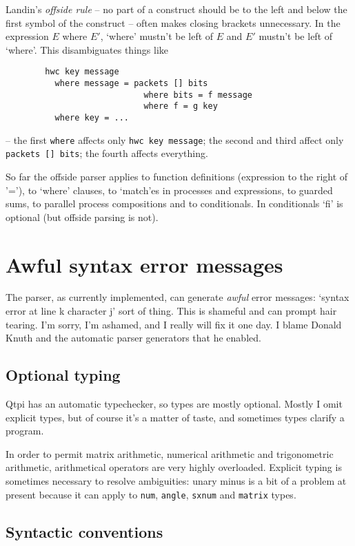 \documentclass[11pt,a4paper]{article}
\newcommand{\verbtt}[1]{\texttt{\small{}#1}}
\begin{document}
Landin's \emph{offside rule} -- no part of a construct should be to the left and below the first symbol of the construct -- often makes closing brackets unnecessary. In the expression $E$ where $E'$, `where' mustn't be left of $E$ and $E'$ mustn't be left of `where'. This disambiguates things like 

\begin{verbatim}
		hwc key message
		  where message = packets [] bits
		                    where bits = f message
		                    where f = g key
		  where key = ...
\end{verbatim}
	
-- the first \verbtt{where} affects only \verbtt{hwc key message}; the second and third affect only \verbtt{packets [] bits}; the fourth affects everything.

So far the offside parser applies to function definitions (expression to the right of '='), to `where' clauses, to `match'es in processes and expressions, to guarded sums, to parallel process compositions and to conditionals. In conditionals `fi' is optional (but offside parsing is not).

\section{Awful syntax error messages}

The parser, as currently implemented, can generate \emph{awful} error messages: `syntax error at line k character j' sort of thing. This is shameful and can prompt hair tearing. I'm sorry, I'm ashamed, and I really will fix it one day. I blame Donald Knuth and the automatic parser generators that he enabled.

\subsection{Optional typing}

Qtpi has an automatic typechecker, so types are mostly optional. Mostly I omit explicit types, but of course it's a matter of taste, and sometimes types clarify a program. 

In order to permit matrix arithmetic, numerical arithmetic and trigonometric arithmetic, arithmetical operators are very highly overloaded. Explicit typing is sometimes necessary to resolve ambiguities: unary minus is a bit of a problem at present because it can apply to \verbtt{num}, \verbtt{angle}, \verbtt{sxnum} and \verbtt{matrix} types.

\subsection{Syntactic conventions}
\end{document}
